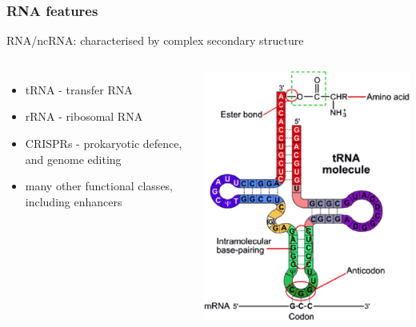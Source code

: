 %
\begin{frame}
  \frametitle{RNA features}
  \textcolor{hutton_blue}{RNA/ncRNA: characterised by complex secondary structure}
  \begin{columns}[T] 
      \begin{itemize}
        \item tRNA - transfer RNA
        \item rRNA - ribosomal RNA
        \item CRISPRs - prokaryotic defence, and genome editing
        \item many other functional classes, including enhancers
      \end{itemize}
      \includegraphics[height=0.7\textheight]{images/rna_feature}
  \end{columns}    
\end{frame}

